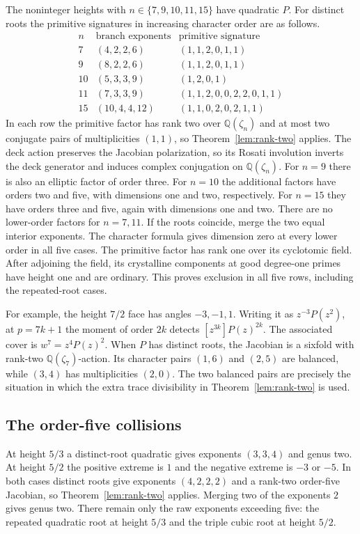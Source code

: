 The noninteger heights with \(n\in\{7,9,10,11,15\}\) have quadratic \(P\).
For distinct roots the primitive signatures in increasing character order
are as follows.
\[
\begin{array}{c|c|c}
n&\text{branch exponents}&\text{primitive signature}\\ \hline
7 &(4,2,2,6)&(1,1,2,0,1,1)\\
9 &(8,2,2,6)&(1,1,2,0,1,1)\\
10&(5,3,3,9)&(1,2,0,1)\\
11&(7,3,3,9)&(1,1,2,0,0,2,2,0,1,1)\\
15&(10,4,4,12)&(1,1,0,2,0,2,1,1)
\end{array}
\]
In each row the primitive factor has rank two over \(\mathbb Q(\zeta_n)\)
and at most two conjugate pairs of multiplicities \((1,1)\), so
Theorem~\ref{lem:rank-two} applies. The deck action preserves the
Jacobian polarization, so its Rosati involution inverts the deck generator
and induces complex conjugation on \(\mathbb Q(\zeta_n)\). For \(n=9\)
there is also an elliptic factor of order three. For \(n=10\) the
additional factors have orders two and five, with dimensions one and
two, respectively. For \(n=15\) they have orders three and five, again
with dimensions one and two. There are no lower-order factors for
\(n=7,11\). If the roots coincide, merge the two equal interior
exponents. The character formula gives dimension zero at every lower
order in all five cases. The primitive factor has rank one over its
cyclotomic field. After
adjoining the field, its crystalline components at good degree-one primes
have height one and are ordinary. This proves exclusion in all five
rows, including the repeated-root cases.

For example, the height \(7/2\) face has angles \(-3,-1,1\).
Writing it as \(z^{-3}P(z^2)\), at \(p=7k+1\) the moment of order \(2k\)
detects \([z^{3k}]P(z)^{2k}\). The associated cover is
\(w^7=z^4P(z)^2\). When \(P\) has distinct roots, the Jacobian is a
sixfold with rank-two \(\mathbb Q(\zeta_7)\)-action. Its character pairs
\((1,6)\) and \((2,5)\) are balanced, while \((3,4)\) has multiplicities
\((2,0)\). The two balanced pairs are precisely the situation in which
the extra trace divisibility in Theorem~\ref{lem:rank-two} is used.

\subsection{The order-five collisions}

At height \(5/3\) a distinct-root quadratic gives exponents \((3,3,4)\) and
genus two. At height \(5/2\) the positive extreme is \(1\) and the negative
extreme is \(-3\) or \(-5\). In both cases distinct roots give exponents
\((4,2,2,2)\) and a rank-two order-five Jacobian, so
Theorem~\ref{lem:rank-two} applies. Merging two of the exponents \(2\)
gives genus two. There remain only the raw exponents exceeding five:
the repeated quadratic root at height \(5/3\) and the triple cubic root
at height \(5/2\).

